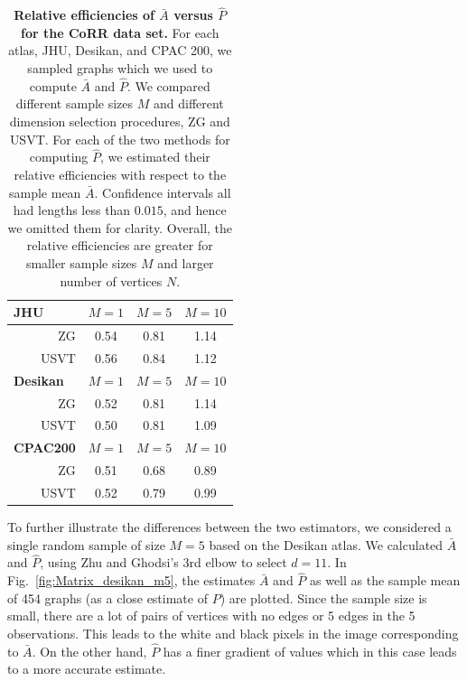 \documentclass[10pt,letterpaper]{article}
\renewcommand{\hat}{\widehat}
\begin{document}
\begin{table}[!tb]
    \centering
\begin{tabular}{rccc}\toprule
\multicolumn{1}{l}{\textbf{JHU}} & $M=1$  & $M=5$  & $M=10$  \\\midrule
ZG      & 0.54 & 0.81 & 1.14 \\
USVT    & 0.56 & 0.84 & 1.12 \\\midrule
\multicolumn{1}{l}{\textbf{Desikan}} & $M=1$  & $M=5$  & $M=10$  \\ \midrule
ZG      & 0.52 & 0.81 & 1.14 \\
USVT    & 0.50 & 0.81 & 1.09 \\\midrule
\multicolumn{1}{l}{\textbf{CPAC200}} & $M=1$  & $M=5$  & $M=10$  \\\midrule
ZG      & 0.51 & 0.68 & 0.89 \\
USVT    & 0.52 & 0.79 & 0.99 \\\bottomrule
\end{tabular}
    \caption{{\bf Relative efficiencies of $\bar{A}$ versus $\hat{P}$ for the CoRR data set.}
    For each atlas, JHU, Desikan, and CPAC 200, we sampled graphs which we used to compute $\bar{A}$ and $\hat{P}$.
     We compared different sample sizes $M$ and different dimension selection procedures, ZG and USVT.
    For each of the two methods for computing $\hat{P}$, we estimated their relative efficiencies with respect to the sample mean $\bar{A}$.
    Confidence intervals all had lengths less than $0.015$, and hence we omitted them for clarity.
    Overall, the relative efficiencies are greater for smaller sample sizes $M$ and larger number of vertices $N$. 
    } 
    \label{tab:corr_re}
\end{table}



To further illustrate the differences between the two estimators, we considered a single random sample of size $M=5$ based on the Desikan atlas.
We calculated $\bar{A}$ and $\hat{P}$, using  Zhu and Ghodsi's 3rd elbow to select $d=11$. 
In Fig.~\ref{fig:Matrix_desikan_m5}, the estimates $\bar{A}$ and $\hat{P}$ as well as the sample mean of 454 graphs (as a close estimate of $P$) are plotted. 
Since the sample size is small, there are a lot of pairs of vertices with no edges or 5 edges in the 5 observations.
This leads to the white and black pixels in the image corresponding to $\bar{A}$.
On the other hand, $\hat{P}$ has a finer gradient of values which in this case leads to a more accurate estimate.
\end{document}
